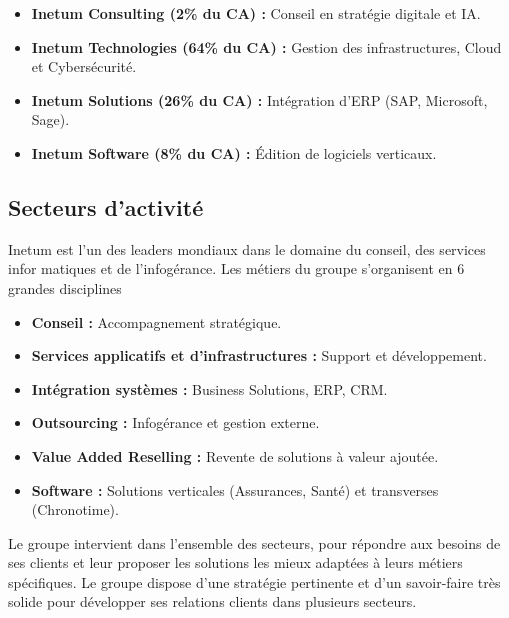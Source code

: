 \begin{itemize}
    \setlength\itemsep{0.1em}  %
    \setlength\parskip{0pt}    %
    \setlength\parsep{0pt}
    \item \textbf{Inetum Consulting (2\% du CA) :} Conseil en stratégie digitale et IA.
    \item \textbf{Inetum Technologies (64\% du CA) :} Gestion des infrastructures, Cloud et Cybersécurité.
    \item \textbf{Inetum Solutions (26\% du CA) :} Intégration d'ERP (SAP, Microsoft, Sage).
    \item \textbf{Inetum Software (8\% du CA) :} Édition de logiciels verticaux.
\end{itemize}

\subsection{Secteurs d’activité}
Inetum est l’un des leaders mondiaux dans le domaine du conseil, des services infor
matiques et de l’infogérance. Les métiers du groupe s’organisent en 6 grandes disciplines 

\begin{itemize}
    \setlength\itemsep{0.1em}  %
    \setlength\parskip{0pt}    %
    \setlength\parsep{0pt}
    \item \textbf{Conseil :} Accompagnement stratégique.
    \item \textbf{Services applicatifs et d’infrastructures :} Support et développement.
    \item \textbf{Intégration systèmes :} Business Solutions, ERP, CRM.
    \item \textbf{Outsourcing :} Infogérance et gestion externe.
    \item \textbf{Value Added Reselling :} Revente de solutions à valeur ajoutée.
    \item \textbf{Software :} Solutions verticales (Assurances, Santé) et transverses (Chronotime).
\end{itemize}

Le groupe intervient dans l’ensemble des secteurs, pour répondre aux besoins de ses
clients et leur proposer les solutions les mieux adaptées à leurs métiers spécifiques. Le
groupe dispose d’une stratégie pertinente et d’un savoir-faire très solide pour développer
ses relations clients dans plusieurs secteurs.

